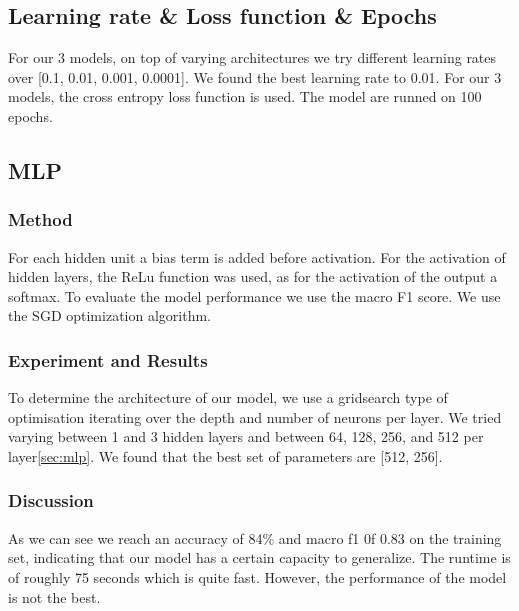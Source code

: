 \subsection{Learning rate \& Loss function \& Epochs}
For our 3 models, on top of varying architectures we try different learning rates over [0.1, 0.01, 0.001, 0.0001]. We found the best learning rate to 0.01. For our 3 models, the cross entropy loss function is used. The model are runned on 100 epochs. 


\subsection{MLP}
\subsubsection{Method}
\label{sec:method}

For each hidden unit a bias term is added before activation. For the activation of hidden layers, the ReLu function was used, as for the activation of the output a softmax. To evaluate the model performance we use the macro F1 score. We use the SGD optimization algorithm. 
\subsubsection{Experiment and Results}
To determine the architecture of our model, we use a gridsearch type of optimisation iterating over the depth and number of neurons per layer. We tried varying between 1 and 3 hidden layers and between 64, 128, 256, and 512 per layer\ref{sec:mlp}.
We found that the best set of parameters are [512, 256]. 
\begin{center}
  \label{tab:macro_f1_accuracy}
\end{center}

\subsubsection{Discussion}
As we can see we reach an accuracy of 84\%  and macro f1 0f 0.83 on the training set, indicating that our model has a certain capacity to generalize. The runtime is of roughly 75 seconds which is quite fast. However, the performance of the model is not the best. 

